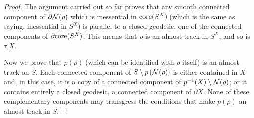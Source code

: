 \begin{proof}
The argument carried out so far proves that any smooth connected component of $\partial\bar{{\mathcal N}}(\rho)$ which is inessential in $\mathrm{core}(S^X)$ (which is the same as saying, inessential in $S^X$) is parallel to a closed geodesic, one of the connected components of $\partial\mathrm{core}(S^X)$. This means that $\rho$ is an almost track in $S^X$, and so is $\tau|X$.

Now we prove that $p(\rho)$ (which can be identified with $\rho$ itself) is an almost track on $S$. Each connected component of $S\setminus p\left({\mathcal N}(\rho)\right)$ is either contained in $X$ and, in this case, it is a copy of a connected component of $p^{-1}(X)\setminus {\mathcal N}(\rho)$; or it contains entirely a closed geodesic, a connected component of $\partial X$. None of these complementary components may transgress the conditions that make $p(\rho)$ an almost track in $S$.
\end{proof}

